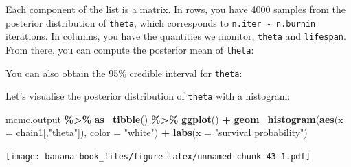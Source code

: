\documentclass[
  12pt,
]{krantz}
\newenvironment{Shaded}{\begin{snugshade}}{\end{snugshade}}
\newcommand{\AttributeTok}[1]{\textcolor[rgb]{0.13,0.29,0.53}{#1}}
\newcommand{\DecValTok}[1]{\textcolor[rgb]{0.00,0.00,0.81}{#1}}
\newcommand{\DocumentationTok}[1]{\textcolor[rgb]{0.56,0.35,0.01}{\textbf{\textit{#1}}}}
\newcommand{\FloatTok}[1]{\textcolor[rgb]{0.00,0.00,0.81}{#1}}
\newcommand{\FunctionTok}[1]{\textcolor[rgb]{0.13,0.29,0.53}{\textbf{#1}}}
\newcommand{\NormalTok}[1]{#1}
\newcommand{\SpecialCharTok}[1]{\textcolor[rgb]{0.81,0.36,0.00}{\textbf{#1}}}
\newcommand{\StringTok}[1]{\textcolor[rgb]{0.31,0.60,0.02}{#1}}
\begin{document}
Each component of the list is a matrix. In rows, you have 4000 samples from the posterior distribution of \texttt{theta}, which corresponds to \texttt{n.iter\ -\ n.burnin} iterations. In columns, you have the quantities we monitor, \texttt{theta} and \texttt{lifespan}. From there, you can compute the posterior mean of \texttt{theta}:

\begin{Shaded}
\end{Shaded}

You can also obtain the 95\% credible interval for \texttt{theta}:

\begin{Shaded}
\end{Shaded}

Let's visualise the posterior distribution of \texttt{theta} with a histogram:

\begin{Shaded}
\begin{Highlighting}[]
\NormalTok{mcmc.output }\SpecialCharTok{\%\textgreater{}\%}
  \FunctionTok{as\_tibble}\NormalTok{() }\SpecialCharTok{\%\textgreater{}\%}
  \FunctionTok{ggplot}\NormalTok{() }\SpecialCharTok{+}
  \FunctionTok{geom\_histogram}\NormalTok{(}\FunctionTok{aes}\NormalTok{(}\AttributeTok{x =}\NormalTok{ chain1[,}\StringTok{"theta"}\NormalTok{]), }\AttributeTok{color =} \StringTok{"white"}\NormalTok{) }\SpecialCharTok{+}
  \FunctionTok{labs}\NormalTok{(}\AttributeTok{x =} \StringTok{"survival probability"}\NormalTok{)}
\end{Highlighting}
\end{Shaded}

\texttt{[image: banana-book\_files/figure-latex/unnamed-chunk-43-1.pdf]}
\end{document}
